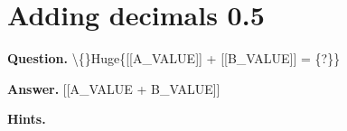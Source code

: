 \documentclass{article}
\begin{document}
\section*{Adding decimals 0.5}
\textbf{Question.} \textbackslash\{\}Huge\{[[A\_VALUE]] + [[B\_VALUE]] = \{?\}\}

\textbf{Answer.} [[A\_VALUE + B\_VALUE]]

\textbf{Hints.}
\begin{itemize}

\end{itemize}
\end{document}
